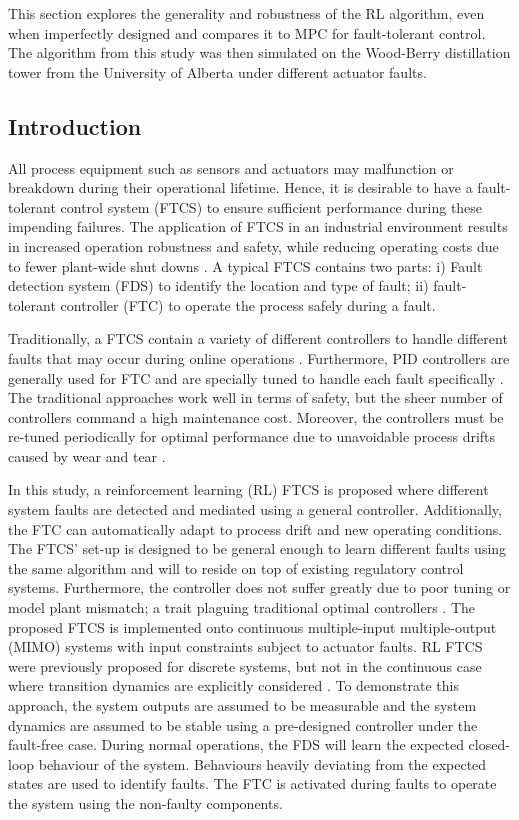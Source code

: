 This section explores the generality and robustness of the RL algorithm, even when imperfectly designed and compares it to MPC for fault-tolerant control.  The algorithm from this study was then simulated on the Wood-Berry distillation tower from the University of Alberta under different actuator faults.

\subsection{Introduction}
All process equipment such as sensors and actuators may malfunction or breakdown during their operational lifetime. Hence, it is desirable to have a fault-tolerant control system (FTCS) to ensure sufficient performance during these impending failures. The application of FTCS in an industrial environment results in increased operation robustness and safety, while reducing operating costs due to fewer plant-wide shut downs \cite{ftc_book_ref1}. A typical FTCS contains two parts: i) Fault detection system (FDS) to identify the location and type of fault; ii) fault-tolerant controller (FTC) to operate the process safely during a fault.

Traditionally, a FTCS contain a variety of different controllers to handle different faults that may occur during online operations \cite{ftc_book_ref1}. Furthermore, PID controllers are generally used for FTC and are specially tuned to handle each fault specifically \cite{process_faults}. The traditional approaches work well in terms of safety, but the sheer number of controllers command a  high maintenance cost.  Moreover, the controllers must be re-tuned periodically for optimal performance due to unavoidable process drifts caused by wear and tear \cite{process_control_ref13}.

In this study, a reinforcement learning (RL) FTCS is proposed where different system faults are detected and mediated using a general controller. Additionally, the FTC can automatically adapt to process drift and new operating conditions. The FTCS' set-up is designed to be general enough to learn different faults using the same algorithm and will to reside on top of existing regulatory control systems.  Furthermore, the controller does not suffer greatly due to poor tuning or model plant mismatch; a trait plaguing traditional optimal controllers \cite{model_plant_mismatch}.  The proposed FTCS is implemented onto continuous multiple-input multiple-output (MIMO) systems with input constraints subject to actuator faults. RL FTCS were previously proposed for discrete systems, but not in the continuous case where transition dynamics are explicitly considered \cite{ftc_ex2_ref5, ftc_ex1_ref6}. To demonstrate this approach, the system outputs are assumed to be measurable and the system dynamics are assumed to be stable using a pre-designed controller under the fault-free case.  During normal operations, the FDS will learn the expected closed-loop behaviour of the system.  Behaviours heavily deviating from the expected states are used to identify faults. The FTC is activated during faults to operate the system using the non-faulty components.

